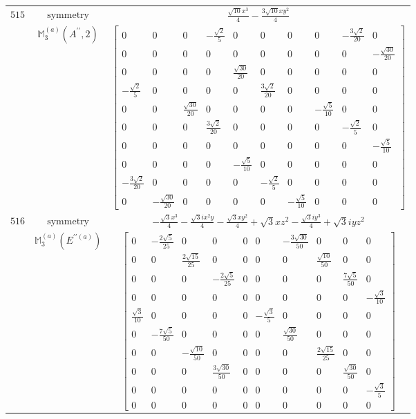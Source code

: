 \documentclass[fleqn,8pt,landscape]{jsarticle}
\begin{document}
\begin{longtable}{ccc}
$ 515 $ & $ \text{symmetry} $ & $ \frac{\sqrt{10} x^{3}}{4} - \frac{3 \sqrt{10} x y^{2}}{4} $ \\
$  $ & $ \mathbb{M}_{3}^{(a)}(A^{\prime\prime},2) $ & $ \begin{bmatrix} 0 & 0 & 0 & - \frac{\sqrt{2}}{5} & 0 & 0 & 0 & 0 & - \frac{3 \sqrt{2}}{20} & 0 \\ 0 & 0 & 0 & 0 & 0 & 0 & 0 & 0 & 0 & - \frac{\sqrt{30}}{20} \\ 0 & 0 & 0 & 0 & \frac{\sqrt{30}}{20} & 0 & 0 & 0 & 0 & 0 \\ - \frac{\sqrt{2}}{5} & 0 & 0 & 0 & 0 & \frac{3 \sqrt{2}}{20} & 0 & 0 & 0 & 0 \\ 0 & 0 & \frac{\sqrt{30}}{20} & 0 & 0 & 0 & 0 & - \frac{\sqrt{5}}{10} & 0 & 0 \\ 0 & 0 & 0 & \frac{3 \sqrt{2}}{20} & 0 & 0 & 0 & 0 & - \frac{\sqrt{2}}{5} & 0 \\ 0 & 0 & 0 & 0 & 0 & 0 & 0 & 0 & 0 & - \frac{\sqrt{5}}{10} \\ 0 & 0 & 0 & 0 & - \frac{\sqrt{5}}{10} & 0 & 0 & 0 & 0 & 0 \\ - \frac{3 \sqrt{2}}{20} & 0 & 0 & 0 & 0 & - \frac{\sqrt{2}}{5} & 0 & 0 & 0 & 0 \\ 0 & - \frac{\sqrt{30}}{20} & 0 & 0 & 0 & 0 & - \frac{\sqrt{5}}{10} & 0 & 0 & 0 \end{bmatrix} $ \\ \hline
$ 516 $ & $ \text{symmetry} $ & $ - \frac{\sqrt{3} x^{3}}{4} - \frac{\sqrt{3} i x^{2} y}{4} - \frac{\sqrt{3} x y^{2}}{4} + \sqrt{3} x z^{2} - \frac{\sqrt{3} i y^{3}}{4} + \sqrt{3} i y z^{2} $ \\
$  $ & $ \mathbb{M}_{3}^{(a)}(E^{\prime\prime(a)}) $ & $ \begin{bmatrix} 0 & - \frac{2 \sqrt{5}}{25} & 0 & 0 & 0 & 0 & - \frac{3 \sqrt{30}}{50} & 0 & 0 & 0 \\ 0 & 0 & \frac{2 \sqrt{15}}{25} & 0 & 0 & 0 & 0 & \frac{\sqrt{10}}{50} & 0 & 0 \\ 0 & 0 & 0 & - \frac{2 \sqrt{5}}{25} & 0 & 0 & 0 & 0 & \frac{7 \sqrt{5}}{50} & 0 \\ 0 & 0 & 0 & 0 & 0 & 0 & 0 & 0 & 0 & - \frac{\sqrt{3}}{10} \\ \frac{\sqrt{3}}{10} & 0 & 0 & 0 & 0 & - \frac{\sqrt{3}}{5} & 0 & 0 & 0 & 0 \\ 0 & - \frac{7 \sqrt{5}}{50} & 0 & 0 & 0 & 0 & \frac{\sqrt{30}}{50} & 0 & 0 & 0 \\ 0 & 0 & - \frac{\sqrt{10}}{50} & 0 & 0 & 0 & 0 & \frac{2 \sqrt{15}}{25} & 0 & 0 \\ 0 & 0 & 0 & \frac{3 \sqrt{30}}{50} & 0 & 0 & 0 & 0 & \frac{\sqrt{30}}{50} & 0 \\ 0 & 0 & 0 & 0 & 0 & 0 & 0 & 0 & 0 & - \frac{\sqrt{3}}{5} \\ 0 & 0 & 0 & 0 & 0 & 0 & 0 & 0 & 0 & 0 \end{bmatrix} $ \\ \hline

\end{longtable}
\end{document}

